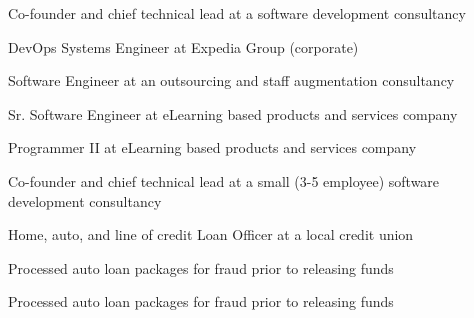 
Co-founder and chief technical lead at a software development consultancy

\newpage

DevOps Systems Engineer at Expedia Group (corporate) 

\divider

Software Engineer at an outsourcing and staff augmentation consultancy

\divider

Sr. Software Engineer at eLearning based products and services company

\divider

Programmer II at eLearning based products and services company

\divider

Co-founder and chief technical lead at a small (3-5 employee) software development consultancy 

\divider

Home, auto, and line of credit Loan Officer at a local credit union

\divider

Processed auto loan packages for fraud prior to releasing funds

\divider

Processed auto loan packages for fraud prior to releasing funds

\bigskip
